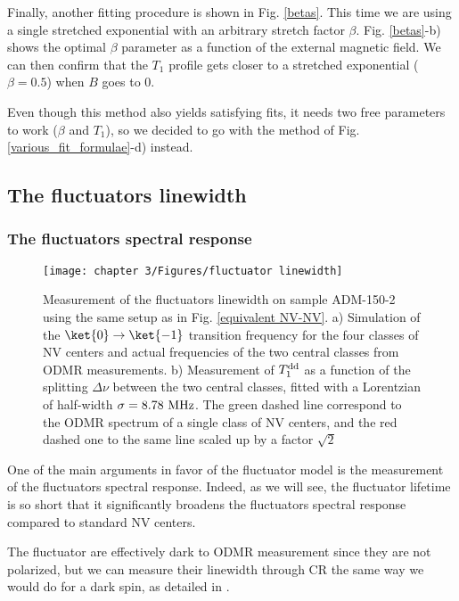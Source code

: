 \documentclass[a4paper,11pt]{report}
\begin{document}
\begin{refsection}
Finally, another fitting procedure is shown in Fig. \ref{betas}. This time we are using a single stretched exponential with an arbitrary stretch factor $\beta$. Fig. \ref{betas}-b) shows the optimal $\beta$ parameter as a function of the external magnetic field. We can then confirm that the $T_1$ profile gets closer to a stretched exponential ($\beta=0.5$) when $B$ goes to 0. 

Even though this method also yields satisfying fits, it needs two free parameters to work ($\beta$ and $T_1$), so we decided to go with the method of Fig. \ref{various_fit_formulae}-d) instead.

\subsection{The fluctuators linewidth}

\subsubsection{The fluctuators spectral response}
\begin{figure}[h]
\centering
\texttt{[image: chapter 3/Figures/fluctuator linewidth]}
\caption{Measurement of the fluctuators linewidth on sample ADM-150-2 using the same setup as in Fig. \ref{equivalent NV-NV}. a) Simulation of the $\ket{0} \to \ket{-1}$ transition frequency for the four classes of NV centers and actual frequencies of the two central classes from ODMR measurements. b) Measurement of $T_1^{\rm dd}$ as a function of the splitting $\Delta \nu$ between the two central classes, fitted with a Lorentzian of half-width $\sigma=8.78\ \rm MHz$. The green dashed line correspond to the ODMR spectrum of a single class of NV centers, and the red dashed one to the same line scaled up by a factor $\sqrt{2}$}
\label{fluct linewidth}
\end{figure}



One of the main arguments in favor of the fluctuator model is the measurement of the fluctuators spectral response. Indeed, as we will see, the fluctuator lifetime is so short that it significantly broadens the fluctuators spectral response compared to standard NV centers.

The fluctuator are effectively dark to ODMR measurement since they are not polarized, but we can measure their linewidth through CR the same way we would do for a dark spin, as detailed in \citep{hall2016detection}.


\end{refsection}
\end{document}

